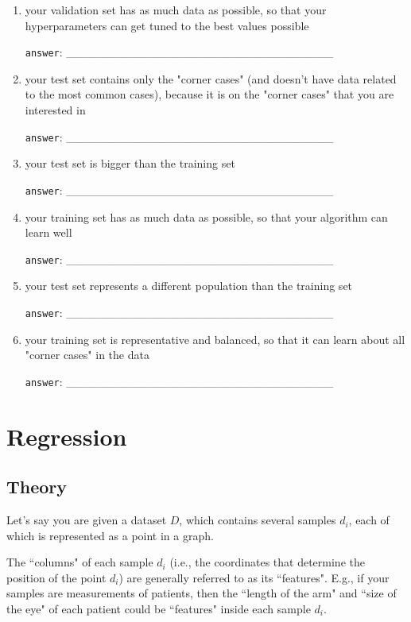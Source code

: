 \documentclass[a4paper,11pt]{scrartcl}
\begin{document}
\begin{enumerate}[label=\alph*)]
\item your validation set has as much data as possible, so that your
      hyperparameters can get tuned to the best values possible

\verb|answer|: \_\_\_\_\_\_\_\_\_\_\_\_\_\_\_\_\_\_\_\_\_\_\_\_\_\_\_\_\_\_\_\_

\item your test set contains only the "corner cases" (and doesn't have data
      related to the most common cases), because it is on the "corner cases"
      that you are interested in

\verb|answer|: \_\_\_\_\_\_\_\_\_\_\_\_\_\_\_\_\_\_\_\_\_\_\_\_\_\_\_\_\_\_\_\_

\item your test set is bigger than the training set

\verb|answer|: \_\_\_\_\_\_\_\_\_\_\_\_\_\_\_\_\_\_\_\_\_\_\_\_\_\_\_\_\_\_\_\_

\item your training set has as much data as possible, so that your algorithm
      can learn well

\verb|answer|: \_\_\_\_\_\_\_\_\_\_\_\_\_\_\_\_\_\_\_\_\_\_\_\_\_\_\_\_\_\_\_\_

\item your test set represents a different population than the training set

\verb|answer|: \_\_\_\_\_\_\_\_\_\_\_\_\_\_\_\_\_\_\_\_\_\_\_\_\_\_\_\_\_\_\_\_

\item your training set is representative and balanced, so that it can learn
      about all "corner cases" in the data

\verb|answer|: \_\_\_\_\_\_\_\_\_\_\_\_\_\_\_\_\_\_\_\_\_\_\_\_\_\_\_\_\_\_\_\_

\end{enumerate}


\section{Regression}

\subsection{Theory}

Let's say you are given a dataset $D$, which contains several samples $d_i$,
each of which is represented as a point in a graph.

\vspace{0.5cm}
\begin{story}[title=A note on the jargon]
\singlespacing
The ``columns" of each sample $d_i$ (i.e., the coordinates that determine the
position of the point $d_i$) are generally referred to as its ``features".
E.g., if your samples are measurements of patients, then the ``length of the
arm" and ``size of the eye" of each patient could be ``features" inside
each sample $d_i$.
\end{story}
\end{document}
